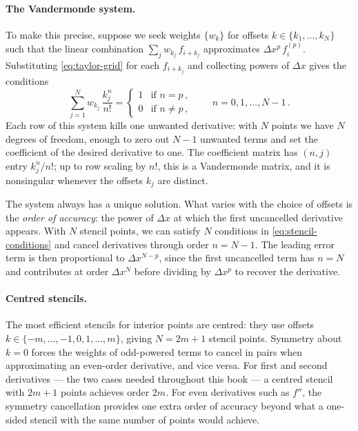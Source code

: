\paragraph{The Vandermonde system.}

To make this precise, suppose we seek weights $\{w_k\}$ for offsets
$k \in \{k_1, \ldots, k_N\}$ such that the linear combination
$\sum_j w_{k_j}\,f_{i+k_j}$ approximates
$\Delta x^p\,f^{(p)}_i$.  Substituting
\cref{eq:taylor-grid} for each $f_{i+k_j}$ and collecting powers of
$\Delta x$ gives the conditions
%
\begin{equation}
  \sum_{j=1}^{N} w_{k_j}\,\frac{k_j^n}{n!}
  = \begin{cases}
      1 & \text{if } n = p \,, \\
      0 & \text{if } n \neq p \,,
    \end{cases}
  \qquad n = 0, 1, \ldots, N-1 \,.
  \label{eq:stencil-conditions}
\end{equation}
%
Each row of this system kills one unwanted derivative: with $N$ points we
have $N$ degrees of freedom, enough to zero out $N - 1$ unwanted terms and
set the coefficient of the desired derivative to one.  The coefficient
matrix has $(n, j)$ entry $k_j^n/n!$; up to row scaling by $n!$, this is a
Vandermonde matrix, and it is nonsingular whenever the offsets $k_j$ are
distinct.

The system always has a unique solution.  What varies with the choice of
offsets is the \emph{order of accuracy}: the power of $\Delta x$ at which the
first uncancelled derivative appears.  With $N$ stencil points, we can satisfy
$N$ conditions in \cref{eq:stencil-conditions} and cancel derivatives through
order $n = N - 1$.  The leading error term is then proportional to
$\Delta x^{N-p}$, since the first uncancelled term has $n = N$ and contributes
at order $\Delta x^N$ before dividing by $\Delta x^p$ to recover the
derivative.

\paragraph{Centred stencils.}

The most efficient stencils for interior points are centred: they use offsets
$k \in \{-m, \ldots, -1, 0, 1, \ldots, m\}$, giving $N = 2m + 1$ stencil
points.  Symmetry about $k = 0$ forces the weights of odd-powered terms to
cancel in pairs when approximating an even-order derivative, and vice versa.
For first and second derivatives --- the two cases needed throughout this book
--- a centred stencil with $2m + 1$ points achieves order $2m$.  For even
derivatives such as $f''$, the symmetry cancellation provides one extra order
of accuracy beyond what a one-sided stencil with the same number of points
would achieve.

